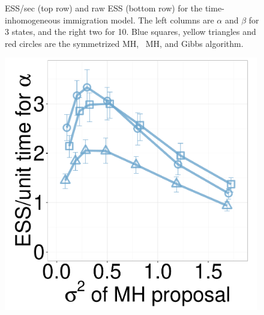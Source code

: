 \begin{figure}[H]
\begin{minipage}[hp]{0.24\linewidth}
	\end{minipage}
    \caption{ESS/sec (top row) and raw ESS (bottom row) for the time-inhomogeneous immigration model. The left columns are $\alpha$ and $\beta$ for 3 states, and the right two for 10. {Blue squares, yellow triangles and red circles} are the symmetrized MH, \naive\ MH, and Gibbs algorithm. }
     \label{fig:ESS_pc_10}
  \end{figure}


  \begin{figure}[H]
  \centering
  \begin{minipage}[!hp]{0.24\linewidth}
  \centering
    \includegraphics [width=0.99\textwidth, angle=0]{figs/new_whole_exp_figs/mh_cq_alpha_dim3.pdf}
\end{minipage}
  \begin{minipage}[hp]{0.24\linewidth}
  \centering

\end{minipage}
\end{figure}
